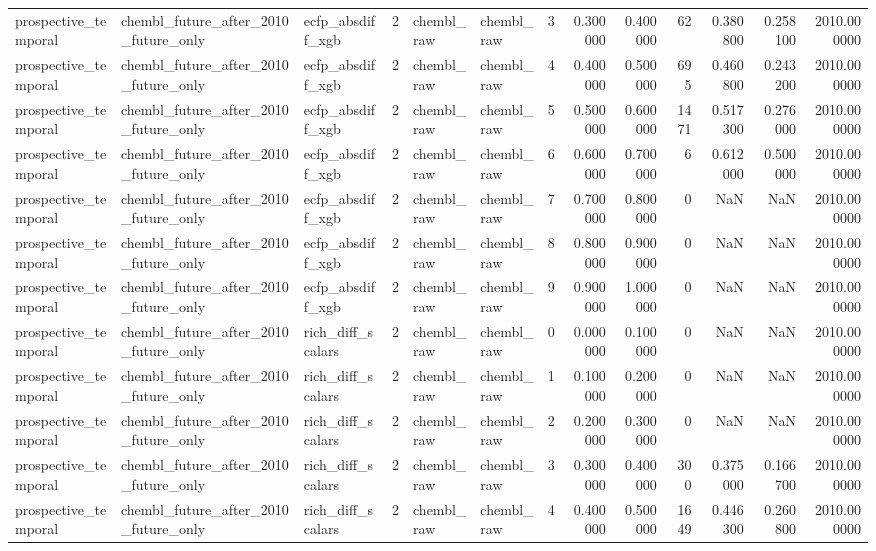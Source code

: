 \begin{longtable}{lllrllrrrrrrr}
prospective\_temporal & chembl\_future\_after\_2010\_future\_only & ecfp\_absdiff\_xgb & 2 & chembl\_raw & chembl\_raw & 3 & 0.300000 & 0.400000 & 62 & 0.380800 & 0.258100 & 2010.000000 \\
prospective\_temporal & chembl\_future\_after\_2010\_future\_only & ecfp\_absdiff\_xgb & 2 & chembl\_raw & chembl\_raw & 4 & 0.400000 & 0.500000 & 695 & 0.460800 & 0.243200 & 2010.000000 \\
prospective\_temporal & chembl\_future\_after\_2010\_future\_only & ecfp\_absdiff\_xgb & 2 & chembl\_raw & chembl\_raw & 5 & 0.500000 & 0.600000 & 1471 & 0.517300 & 0.276000 & 2010.000000 \\
prospective\_temporal & chembl\_future\_after\_2010\_future\_only & ecfp\_absdiff\_xgb & 2 & chembl\_raw & chembl\_raw & 6 & 0.600000 & 0.700000 & 6 & 0.612000 & 0.500000 & 2010.000000 \\
prospective\_temporal & chembl\_future\_after\_2010\_future\_only & ecfp\_absdiff\_xgb & 2 & chembl\_raw & chembl\_raw & 7 & 0.700000 & 0.800000 & 0 & NaN & NaN & 2010.000000 \\
prospective\_temporal & chembl\_future\_after\_2010\_future\_only & ecfp\_absdiff\_xgb & 2 & chembl\_raw & chembl\_raw & 8 & 0.800000 & 0.900000 & 0 & NaN & NaN & 2010.000000 \\
prospective\_temporal & chembl\_future\_after\_2010\_future\_only & ecfp\_absdiff\_xgb & 2 & chembl\_raw & chembl\_raw & 9 & 0.900000 & 1.000000 & 0 & NaN & NaN & 2010.000000 \\
prospective\_temporal & chembl\_future\_after\_2010\_future\_only & rich\_diff\_scalars & 2 & chembl\_raw & chembl\_raw & 0 & 0.000000 & 0.100000 & 0 & NaN & NaN & 2010.000000 \\
prospective\_temporal & chembl\_future\_after\_2010\_future\_only & rich\_diff\_scalars & 2 & chembl\_raw & chembl\_raw & 1 & 0.100000 & 0.200000 & 0 & NaN & NaN & 2010.000000 \\
prospective\_temporal & chembl\_future\_after\_2010\_future\_only & rich\_diff\_scalars & 2 & chembl\_raw & chembl\_raw & 2 & 0.200000 & 0.300000 & 0 & NaN & NaN & 2010.000000 \\
prospective\_temporal & chembl\_future\_after\_2010\_future\_only & rich\_diff\_scalars & 2 & chembl\_raw & chembl\_raw & 3 & 0.300000 & 0.400000 & 300 & 0.375000 & 0.166700 & 2010.000000 \\
prospective\_temporal & chembl\_future\_after\_2010\_future\_only & rich\_diff\_scalars & 2 & chembl\_raw & chembl\_raw & 4 & 0.400000 & 0.500000 & 1649 & 0.446300 & 0.260800 & 2010.000000 \\

\end{longtable}
